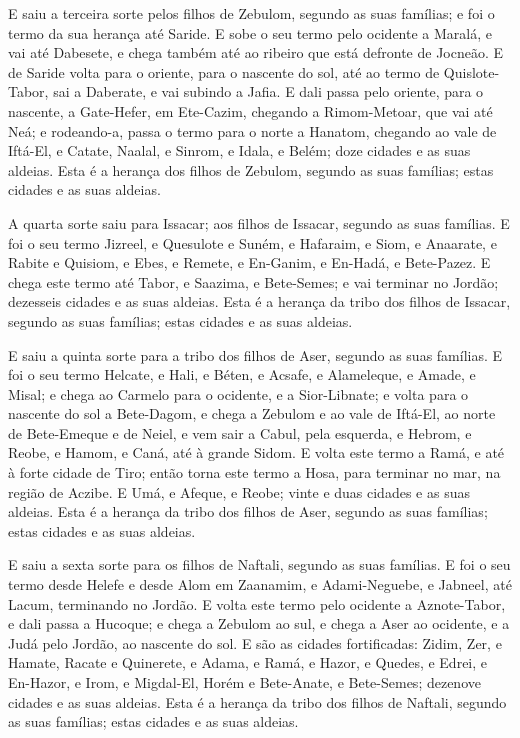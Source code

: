 E saiu a terceira sorte pelos filhos de Zebulom, segundo as suas
famílias; e foi o termo da sua herança até Saride. E sobe o
seu termo pelo ocidente a Maralá, e vai até Dabesete, e chega também
até ao ribeiro que está defronte de Jocneão. E de Saride
volta para o oriente, para o nascente do sol, até ao termo de
Quislote-Tabor, sai a Daberate, e vai subindo a Jafia. E dali
passa pelo oriente, para o nascente, a Gate-Hefer, em Ete-Cazim,
chegando a Rimom-Metoar, que vai até Neá; e rodeando-a, passa
o termo para o norte a Hanatom, chegando ao vale de Iftá-El,
e Catate, Naalal, e Sinrom, e Idala, e Belém; doze cidades e
as suas aldeias. Esta é a herança dos filhos de Zebulom,
segundo as suas famílias; estas cidades e as suas aldeias.

A quarta sorte saiu para Issacar; aos filhos de Issacar, segundo
as suas famílias. E foi o seu termo Jizreel, e Quesulote e
Suném, e Hafaraim, e Siom, e Anaarate, e Rabite e
Quisiom, e Ebes, e Remete, e En-Ganim, e En-Hadá, e
Bete-Pazez. E chega este termo até Tabor, e Saazima, e
Bete-Semes; e vai terminar no Jordão; dezesseis cidades e as suas
aldeias. Esta é a herança da tribo dos filhos de Issacar,
segundo as suas famílias; estas cidades e as suas aldeias.

E saiu a quinta sorte para a tribo dos filhos de Aser, segundo as
suas famílias. E foi o seu termo Helcate, e Hali, e Béten, e
Acsafe, e Alameleque, e Amade, e Misal; e chega ao Carmelo
para o ocidente, e a Sior-Libnate; e volta para o nascente do
sol a Bete-Dagom, e chega a Zebulom e ao vale de Iftá-El, ao norte
de Bete-Emeque e de Neiel, e vem sair a Cabul, pela esquerda,
e Hebrom, e Reobe, e Hamom, e Caná, até à grande Sidom.
E volta este termo a Ramá, e até à forte cidade de Tiro;
então torna este termo a Hosa, para terminar no mar, na região de
Aczibe. E Umá, e Afeque, e Reobe; vinte e duas cidades e as
suas aldeias. Esta é a herança da tribo dos filhos de Aser,
segundo as suas famílias; estas cidades e as suas aldeias.

E saiu a sexta sorte para os filhos de Naftali, segundo as suas
famílias. E foi o seu termo desde Helefe e desde Alom em
Zaanamim, e Adami-Neguebe, e Jabneel, até Lacum, terminando no
Jordão. E volta este termo pelo ocidente a Aznote-Tabor, e
dali passa a Hucoque; e chega a Zebulom ao sul, e chega a Aser ao
ocidente, e a Judá pelo Jordão, ao nascente do sol. E são as
cidades fortificadas: Zidim, Zer, e Hamate, Racate e Quinerete,
e Adama, e Ramá, e Hazor, e Quedes, e Edrei, e
En-Hazor, e Irom, e Migdal-El, Horém e Bete-Anate, e
Bete-Semes; dezenove cidades e as suas aldeias. Esta é a
herança da tribo dos filhos de Naftali, segundo as suas famílias;
estas cidades e as suas aldeias.

